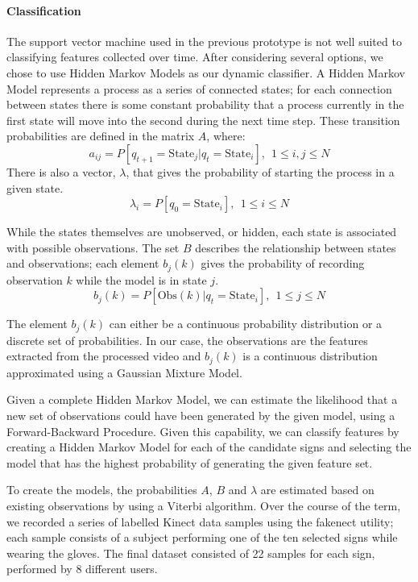 \documentclass[12pt]{article}
\begin{document}
\paragraph{Classification}
The support vector machine used in the previous prototype is not well suited to classifying features collected over time. After considering several options, we chose to use Hidden Markov Models as our dynamic classifier. A Hidden Markov Model represents a process as a series of connected states; for each connection between states there is some constant probability that a process currently in the first state will move into the second during the next time step. These transition probabilities are defined in the matrix \(A\), where:
\begin{equation*}
  a_{ij} = P[q_{t+1} = \text{State}_j | q_t = \text{State}_i], \:\: 1 \leq i,j \leq N
\end{equation*}
There is also a vector, \(\lambda\), that gives the probability of starting the process in a given state.
\begin{equation*}
  \lambda_{i} = P[q_0 = \text{State}_i], \:\: 1 \leq i \leq N
\end{equation*}

While the states themselves are unobserved, or hidden, each state is associated with possible observations. The set \(B\) describes the relationship between states and observations; each element \(b_j(k)\) gives the probability of recording observation \(k\) while the model is in state \(j\). 
\begin{equation*}
  b_j(k) = P[\text{Obs}(k)| q_t = \text{State}_i], \:\: 1 \leq j \leq N
\end{equation*}

The element \(b_j(k)\) can either be a continuous probability distribution or a discrete set of probabilities. In our case, the observations are the features extracted from the processed video and \(b_j(k)\) is a continuous distribution approximated using a Gaussian Mixture Model.

Given a complete Hidden Markov Model, we can estimate the likelihood that a new set of observations could have been generated by the given model, using a Forward-Backward Procedure. Given this capability, we can classify features by creating a Hidden Markov Model for each of the candidate signs and selecting the model that has the highest probability of generating the given feature set. 

To create the models, the probabilities \(A\), \(B\) and \(\lambda\) are estimated based on existing observations by using a Viterbi algorithm. Over the course of the term, we recorded a series of labelled Kinect data samples using the fakenect utility; each sample consists of a subject performing one of the ten selected signs while wearing the gloves. The final dataset consisted of 22 samples for each sign, performed by 8 different users.  
\end{document}
